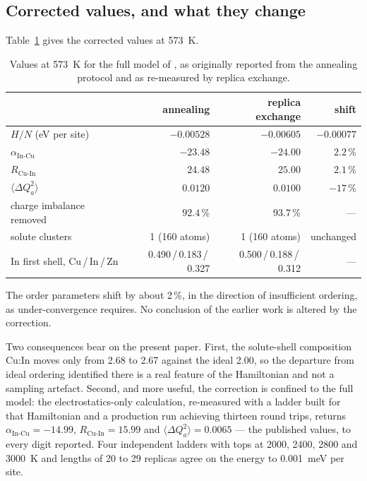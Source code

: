 \documentclass[11pt,a4paper]{article}
\newcommand{\dQ}{\Delta Q}
\newcommand{\aInCu}{\alpha_{\mathrm{In\text{-}Cu}}}
\newcommand{\RCuIn}{R_{\mathrm{Cu\text{-}In}}}
\begin{document}
\subsection{Corrected values, and what they change}

Table~\ref{tab:correction} gives the corrected values at 573~K.

\begin{table}[htbp]
\centering
\caption{Values at 573~K for the full model of \citet{yu2026}, as originally
reported from the annealing protocol and as re-measured by replica exchange.}
\label{tab:correction}
\small
\begin{tabular}{lrrr}
\toprule
& annealing & replica exchange & shift \\
\midrule
$H/N$ (eV per site)          & $-0.00528$ & $-0.00605$ & $-0.00077$ \\
$\aInCu$                      & $-23.48$   & $-24.00$   & $2.2$\,\% \\
$\RCuIn$                      & $24.48$    & $25.00$    & $2.1$\,\% \\
$\langle\dQ_a^2\rangle$       & $0.0120$   & $0.0100$   & $-17$\,\% \\
charge imbalance removed      & $92.4$\,\% & $93.7$\,\% & --- \\
solute clusters               & 1 (160 atoms) & 1 (160 atoms) & unchanged \\
In first shell, Cu\,/\,In\,/\,Zn & 0.490\,/\,0.183\,/\,0.327
                               & 0.500\,/\,0.188\,/\,0.312 & --- \\
\bottomrule
\end{tabular}
\end{table}

The order parameters shift by about 2\,\%, in the direction of insufficient
ordering, as under-convergence requires. No conclusion of the earlier work is
altered by the correction.

Two consequences bear on the present paper. First, the solute-shell composition
Cu:In moves only from 2.68 to 2.67 against the ideal 2.00, so the departure from
ideal ordering identified there is a real feature of the Hamiltonian and not a
sampling artefact. Second, and more useful, the correction is confined to the
full model: the electrostatics-only calculation, re-measured with a ladder built
for that Hamiltonian and a production run achieving thirteen round trips,
returns $\aInCu = -14.99$, $\RCuIn = 15.99$ and
$\langle\dQ_a^2\rangle = 0.0065$ --- the published values, to every digit
reported. Four independent ladders with tops at 2000, 2400, 2800 and 3000~K and
lengths of 20 to 29 replicas agree on the energy to 0.001~meV per site.
\end{document}
